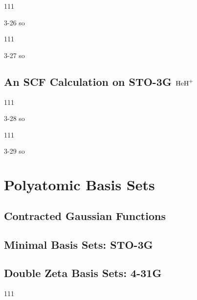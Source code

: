 \documentclass[a4paper]{book}
\begin{document}
	\begin{exercise}
	111
	\end{exercise}
	
	\begin{solution}
		3-26 so
	\end{solution}
	
	\begin{exercise}
	111
	\end{exercise}
	
	\begin{solution}
		3-27 so
	\end{solution}
	
	\subsection{An SCF Calculation on STO-3G \texorpdfstring{$\ce{HeH+}$}-}
	
	\begin{exercise}
	111
	\end{exercise}
	
	\begin{solution}
		3-28 so
	\end{solution}
	
	\begin{exercise}
	111
	\end{exercise}
	
	\begin{solution}
		3-29 so
	\end{solution}
	
	\section{Polyatomic Basis Sets}
	
	\subsection{Contracted Gaussian Functions}
	
	\subsection{Minimal Basis Sets: STO-3G}
	
	\subsection{Double Zeta Basis Sets: 4-31G}
	
	\begin{exercise}
	111
	\end{exercise}
	
\end{document}
